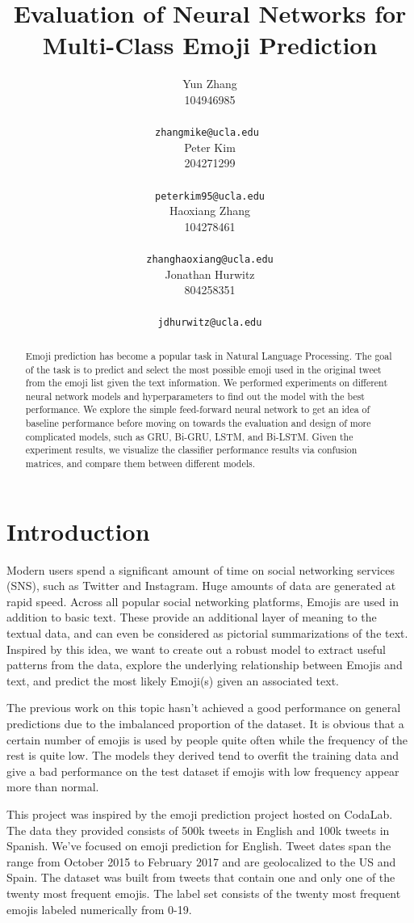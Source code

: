 \documentclass[11pt,a4paper]{article}
\title{Evaluation of Neural Networks for Multi-Class Emoji Prediction}
\author{Yun Zhang \\
	 104946985 \\
	 \\
	\small{\tt zhangmike@ucla.edu } \\\And
	Peter Kim \\
	204271299 \\
	 \\
	\small{\tt peterkim95@ucla.edu} \\\And
	Haoxiang Zhang \\
	104278461 \\
	 \\
	\small{\tt zhanghaoxiang@ucla.edu} \\\And
	 Jonathan Hurwitz \\
	 804258351 \\
	 \\
	\small{\tt jdhurwitz@ucla.edu} \\
}
\date{}
\begin{document}
	\maketitle
	\begin{abstract}
	Emoji prediction has become a popular task in Natural Language Processing. The goal of the task is to predict and select the most possible emoji used in the original tweet from the emoji list given the text information. We performed experiments on different neural network models and hyperparameters to find out the model with the best performance. We explore the simple feed-forward neural network to get an idea of baseline performance before moving on towards the evaluation and design of more complicated models, such as GRU, Bi-GRU, LSTM, and Bi-LSTM. Given the experiment results, we visualize the classifier performance results via confusion matrices, and compare them between different models.
	\end{abstract}
	
	\section{Introduction}
	
	Modern users spend a significant amount of time on social networking services (SNS), such as Twitter and Instagram. Huge amounts of data are generated at rapid speed. Across all popular social networking platforms, Emojis are used in addition to basic text. These provide an additional layer of meaning to the textual data, and can even be considered as pictorial summarizations of the text. Inspired by this idea, we want to create out a robust model to extract useful patterns from the data, explore the underlying relationship between Emojis and text, and predict the most likely Emoji(s) given an associated text.
	\par
	The previous work on this topic hasn’t achieved a good performance on general predictions due to the imbalanced proportion of the dataset. It is obvious that a certain number of emojis is used by people quite often while the frequency of the rest is quite low. The models they derived tend to overfit the training data and give a bad performance on the test dataset if emojis with low frequency appear more than normal.
	\par
	This project was inspired by the emoji prediction project hosted on CodaLab. The data they provided consists of 500k tweets in English and 100k tweets in Spanish. We’ve focused on emoji prediction for English. Tweet dates span the range from October 2015 to February 2017 and are geolocalized to the US and Spain. The dataset was built from tweets that contain one and only one of the twenty most frequent emojis. The label set consists of the twenty most frequent emojis labeled numerically from 0-19.
	
\end{document}
